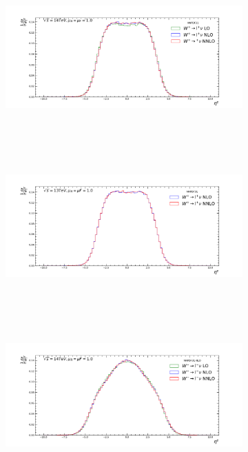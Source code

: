 \begin{figure}[H]
\centering
\begin{subfigure}{0.49\textwidth}
\includegraphics[height=6cm ,width=\textwidth]{chapter4/Ewpeta_rf1_14.pdf}
\vspace*{-8mm}
\caption{}
\label{eeta141}
\end{subfigure}
\begin{subfigure}{0.49\textwidth}
\includegraphics[height=6cm, width=\textwidth]{chapter4/Ewpeta_rf1_13.pdf}
\vspace*{-8mm}
\caption{}
\label{eeta131}
\end{subfigure}
\begin{subfigure}{0.49\textwidth}
\includegraphics[height=6cm, width=\textwidth]{chapter4/Ewmeta_rf1_14.pdf}
\vspace*{-8mm}

\end{subfigure}
\end{figure}
